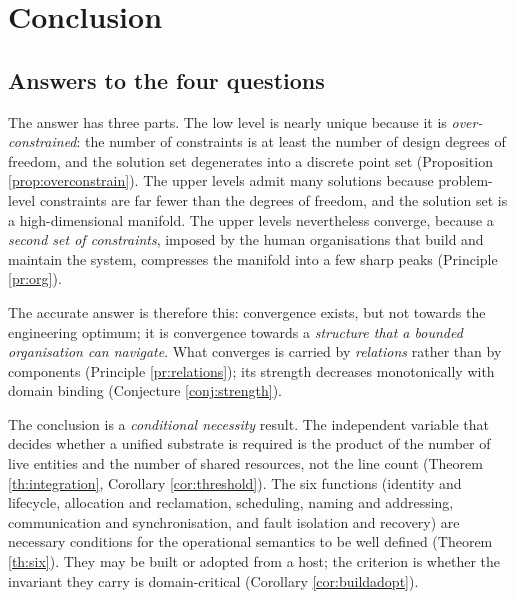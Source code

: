 \chapter{Conclusion}\label{ch:conclusion}

\section{Answers to the four questions}

\begin{problem}
The answer has three parts. The low level is nearly unique because it is
\emph{over-constrained}: the number of constraints is at least the number of design
degrees of freedom, and the solution set degenerates into a discrete point set
(Proposition \ref{prop:overconstrain}). The upper levels admit many solutions because
problem-level constraints are far fewer than the degrees of freedom, and the solution
set is a high-dimensional manifold. The upper levels nevertheless converge, because a
\emph{second set of constraints}, imposed by the human organisations that build and
maintain the system, compresses the manifold into a few sharp peaks
(Principle \ref{pr:org}).

The accurate answer is therefore this: convergence exists, but not towards the
engineering optimum; it is convergence towards a \emph{structure that a bounded
organisation can navigate}. What converges is carried by \emph{relations} rather than by
components (Principle \ref{pr:relations}); its strength decreases monotonically with
domain binding (Conjecture \ref{conj:strength}).
\end{problem}

\begin{problem}
The conclusion is a \emph{conditional necessity} result. The independent variable that
decides whether a unified substrate is required is the product of the number of live
entities and the number of shared resources, not the line count
(Theorem \ref{th:integration}, Corollary \ref{cor:threshold}). The six functions
(identity and lifecycle, allocation and reclamation, scheduling, naming and addressing,
communication and synchronisation, and fault isolation and recovery) are necessary
conditions for the operational semantics to be well defined (Theorem \ref{th:six}). They
may be built or adopted from a host; the criterion is whether the invariant they carry
is domain-critical (Corollary \ref{cor:buildadopt}).
\end{problem}

